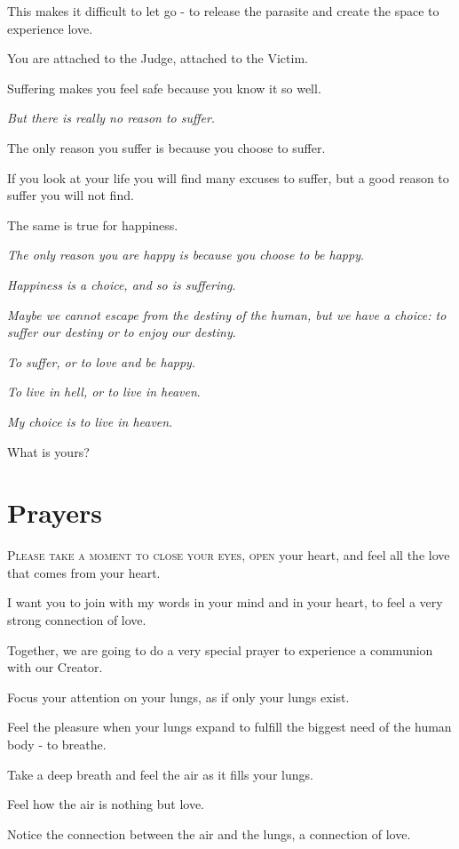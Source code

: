 \documentclass{article}
\numberwithin{equation}{section}
\begin{document}
This makes it difficult to let go - to release the parasite and create the space to experience love.

You are attached to the Judge, attached to the Victim.

Suffering makes you feel safe because you know it so well.

%
\textit{But there is really no reason to suffer}.

The only reason you suffer is because you choose to suffer.

If you look at your life you will find many excuses to suffer, but a good reason to suffer you will not find.

The same is true for happiness.

\textit{The only reason you are happy is because you choose to be happy}.

\textit{Happiness is a choice, and so is suffering}.

%
\textit{Maybe we cannot escape from the destiny of the human, but we have a choice: to suffer our destiny or to enjoy our destiny}.

\textit{To suffer, or to love and be happy}.

\textit{To live in hell, or to live in heaven}.

\textit{My choice is to live in heaven}.

What is yours?

\section{Prayers}
\textsc{Please take a moment to close your eyes, open} your heart, and feel all the love that comes from your heart.

%
I want you to join with my words in your mind and in your heart, to feel a very strong connection of love.

Together, we are going to do a very special prayer to experience a communion with our Creator.

%
Focus your attention on your lungs, as if only your lungs exist.

Feel the pleasure when your lungs expand to fulfill the biggest need of the human body - to breathe.

%
Take a deep breath and feel the air as it fills your lungs.

Feel how the air is nothing but love.

Notice the connection between the air and the lungs, a connection of love.
\end{document}
